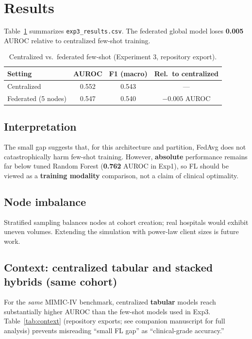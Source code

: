 \section{Results}
\label{sec:results}

Table~\ref{tab:fedmain} summarizes \texttt{exp3\_results.csv}. The federated global model loses \textbf{0.005} AUROC relative to centralized few-shot training.

\begin{table}[htbp]
  \centering
  \caption{Centralized vs.\ federated few-shot (Experiment 3, repository export).}
  \label{tab:fedmain}
  \begin{tabular}{lccc}
    \toprule
    Setting & AUROC & F1 (macro) & Rel.\ to centralized \\
    \midrule
    Centralized & 0.552 & 0.543 & --- \\
    Federated (5 nodes) & 0.547 & 0.540 & $-0.005$ AUROC \\
    \bottomrule
  \end{tabular}
\end{table}

\subsection{Interpretation}
The small gap suggests that, for this architecture and partition, FedAvg does not catastrophically harm few-shot training. However, \textbf{absolute} performance remains far below tuned Random Forest (\textbf{0.762} AUROC in Exp1), so FL should be viewed as a \textbf{training modality} comparison, not a claim of clinical optimality.

\subsection{Node imbalance}
Stratified sampling balances nodes at cohort creation; real hospitals would exhibit uneven volumes. Extending the simulation with power-law client sizes is future work.

\subsection{Context: centralized tabular and stacked hybrids (same cohort)}
For the \emph{same} MIMIC-IV benchmark, centralized \textbf{tabular} models reach substantially higher AUROC than the few-shot models used in Exp3. Table~\ref{tab:context} (repository exports; see companion manuscript for full analysis) prevents misreading ``small FL gap'' as ``clinical-grade accuracy.''

